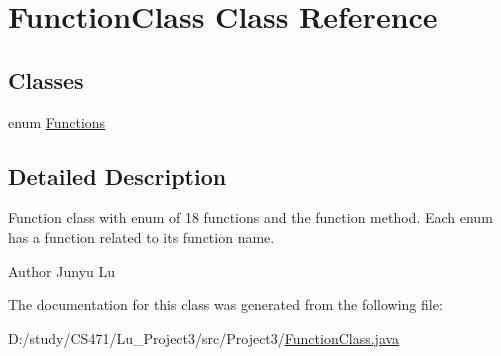 \hypertarget{class_function_class}{}\section{Function\+Class Class Reference}
\label{class_function_class}
\subsection*{Classes}
\begin{DoxyCompactItemize}
\item 
enum \mbox{\hyperlink{enum_function_class_1_1_functions}{Functions}}
\end{DoxyCompactItemize}


\subsection{Detailed Description}
Function class with enum of 18 functions and the function method. Each enum has a function related to its function name.

\begin{DoxyAuthor}{Author}
Junyu Lu 
\end{DoxyAuthor}


The documentation for this class was generated from the following file\+:\begin{DoxyCompactItemize}
\item 
D\+:/study/\+C\+S471/\+Lu\+\_\+\+Project3/src/\+Project3/\mbox{\hyperlink{_function_class_8java}{Function\+Class.\+java}}\end{DoxyCompactItemize}
